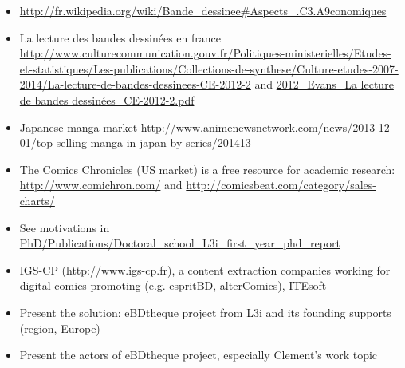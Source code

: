 \begin{itemize}
	\item \url{http://fr.wikipedia.org/wiki/Bande_dessinee#Aspects_.C3.A9conomiques}
	\item La lecture des bandes dessinées en france \url{http://www.culturecommunication.gouv.fr/Politiques-ministerielles/Etudes-et-statistiques/Les-publications/Collections-de-synthese/Culture-etudes-2007-2014/La-lecture-de-bandes-dessinees-CE-2012-2} and \url{2012_Evans_La lecture de bandes dessinées_CE-2012-2.pdf}
	\item Japanese manga market \url{http://www.animenewsnetwork.com/news/2013-12-01/top-selling-manga-in-japan-by-series/201413}
	\item The Comics Chronicles (US market) is a free resource for academic research: \url{http://www.comichron.com/} and \url{http://comicsbeat.com/category/sales-charts/}
	\item See motivations in \url{PhD/Publications/Doctoral_school_L3i_first_year_phd_report}
	\item IGS-CP (http://www.igs-cp.fr), a content extraction companies working for digital comics promoting (e.g. espritBD, alterComics), ITEsoft
	\item Present the solution: eBDtheque project from L3i and its founding supports (region, Europe)
	\item Present the actors of eBDtheque project, especially Clement's work topic

\end{itemize}

